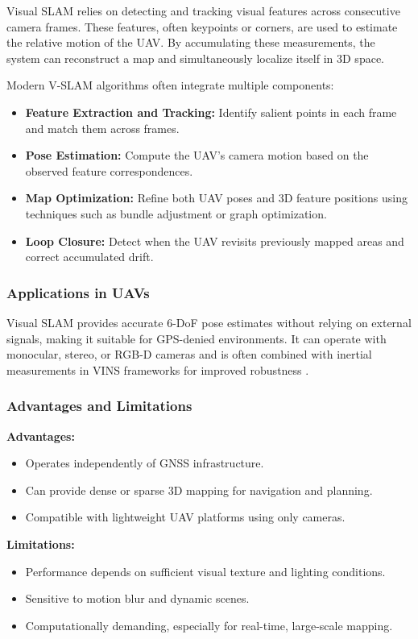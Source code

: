 Visual SLAM relies on detecting and tracking visual features across consecutive camera frames. These features, often keypoints or corners, are used to estimate the relative motion of the UAV. By accumulating these measurements, the system can reconstruct a map and simultaneously localize itself in 3D space.

Modern V-SLAM algorithms often integrate multiple components:

\begin{itemize}
    \item \textbf{Feature Extraction and Tracking:} Identify salient points in each frame and match them across frames.
    \item \textbf{Pose Estimation:} Compute the UAV’s camera motion based on the observed feature correspondences.
    \item \textbf{Map Optimization:} Refine both UAV poses and 3D feature positions using techniques such as bundle adjustment or graph optimization.
    \item \textbf{Loop Closure:} Detect when the UAV revisits previously mapped areas and correct accumulated drift.
\end{itemize}

\subsubsection{Applications in UAVs}

Visual SLAM provides accurate 6-DoF pose estimates without relying on external signals, making it suitable for GPS-denied environments. It can operate with monocular, stereo, or RGB-D cameras and is often combined with inertial measurements in VINS frameworks for improved robustness \cite{qin2018vins, forster2017manifold, cadena2016slam}.

\subsubsection{Advantages and Limitations}

\textbf{Advantages:}
\begin{itemize}
    \item Operates independently of GNSS infrastructure.
    \item Can provide dense or sparse 3D mapping for navigation and planning.
    \item Compatible with lightweight UAV platforms using only cameras.
\end{itemize}

\textbf{Limitations:}
\begin{itemize}
    \item Performance depends on sufficient visual texture and lighting conditions.
    \item Sensitive to motion blur and dynamic scenes.
    \item Computationally demanding, especially for real-time, large-scale mapping.
\end{itemize}